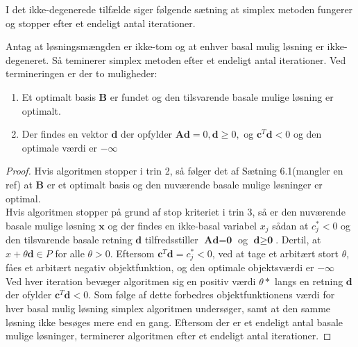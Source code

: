 I det ikke-degenerede tilfælde siger følgende sætning at simplex metoden fungerer og stopper efter et endeligt antal iterationer.
\begin{thm}{}{}
Antag at løsningsmængden er ikke-tom og at enhver basal mulig løsning er ikke-degeneret.
Så teminerer simplex metoden efter et endeligt antal iterationer. 
Ved termineringen er der to muligheder:
\begin{enumerate}[label = (\alph*)]
\item Et optimalt basis $\textbf{B}$ er fundet og den tilsvarende basale mulige løsning er optimalt.
\item Der findes en vektor $\textbf{d}$ der opfylder $\textbf{Ad}=0,\textbf{d}\geq 0,$ og $\textbf{c}^T\textbf{d}<0$ og den optimale værdi er $-\infty$
\end{enumerate}
\end{thm}
%
\begin{proof}
Hvis algoritmen stopper i trin 2, så følger det af Sætning 6.1(mangler en ref) at $\textbf{B}$ er et optimalt basis og den nuværende basale mulige løsninger er optimal.
\\
Hvis algoritmen stopper på grund af stop kriteriet i trin 3, så er den nuværende basale mulige løsning $\textbf{x}$ og der findes en ikke-basal variabel $x_j$ sådan at $c^*_j<0$ og den tilsvarende basale retning $\textbf{d}$ tilfredsstiller $\textbf{Ad}=\textbf{0}$ og $\textbf{d} \geq \textbf{0}$. Dertil, at $x+\theta \textbf{d}\in P$ for alle $\theta>0$. Eftersom $\textbf{c}^T\textbf{d}=c_j^*<0$, ved at tage et arbitært stort $\theta$, fåes et arbitært negativ objektfunktion, og den optimale objektsværdi er $-\infty$
\\
Ved hver iteration bevæger algoritmen sig en positiv værdi $\theta*$ langs en retning $\textbf{d}$ der ofylder $\textbf{c}^T\textbf{d}<0$. Som følge af dette forbedres objektfunktionens værdi for hver basal mulig løsning simplex algoritmen undersøger, samt at den samme løsning ikke besøges mere end en gang. Eftersom der er et endeligt antal basale mulige løsninger, terminerer algoritmen efter et endeligt antal iterationer.
\end{proof}

%
